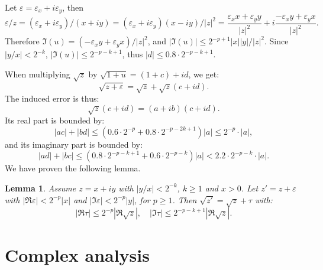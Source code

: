 \documentclass [11pt]{article}
\renewcommand {\epsilon}{\varepsilon}
\newtheorem{lemma}[theorem]{Lemma}
\begin{document}
Let $\epsilon = \epsilon_x + i \epsilon_y$, then
\[ \epsilon/z = (\epsilon_x + i \epsilon_y)/(x + iy) =
  (\epsilon_x + i \epsilon_y)(x-iy)/|z|^2
  = \frac{\epsilon_x x + \epsilon_y y}{|z|^2}
  + i \frac{-\epsilon_x y + \epsilon_y x}{|z|^2}. \]
Therefore $\Im(u) = (-\epsilon_x y + \epsilon_y x)/|z|^2$,
and $|\Im(u)| \le 2^{-p+1} |x| |y|/|z|^2$.
Since $|y/x| < 2^{-k}$, $|\Im(u)| \le 2^{-p-k+1}$,
thus $|d| \le 0.8 \cdot 2^{-p-k+1}$.

When multiplying $\sqrt{z}$ by $\sqrt{1+u} = (1+c)+id$, we get:
\[ \sqrt{z + \epsilon} = \sqrt{z} + \sqrt{z}  (c + i d). \]
The induced error is thus:
\[ \sqrt{z}  (c + i d) = (a + ib) (c + i d). \]
Its real part is bounded by:
\[ |ac| + |bd| \le (0.6 \cdot 2^{-p} + 0.8 \cdot 2^{-p-2k+1}) |a|
  \le 2^{-p} \cdot |a|, \]
and its imaginary part is bounded by:
\[ |ad| + |bc| \le (0.8 \cdot 2^{-p-k+1} + 0.6 \cdot 2^{-p-k}) |a|
  < 2.2 \cdot 2^{-p-k} \cdot |a|. \]
We have proven the following lemma.
\begin{lemma} \label{lem:sqrt}
  Assume $z = x + iy$ with $|y/x| < 2^{-k}$, $k \ge 1$ and $x > 0$.
  Let $z' = z + \epsilon$ with $|\Re\epsilon| < 2^{-p} |x|$
  and $|\Im\epsilon| < 2^{-p} |y|$, for $p \ge 1$.
  Then $\sqrt{z'} = \sqrt{z} + \tau$ with:
  \[ |\Re\tau| \le 2^{-p} |\Re\sqrt{z}|, \quad
     |\Im\tau| \le 2^{-p-k+1} |\Re\sqrt{z}|. \]
\end{lemma}

\section {Complex analysis}
\end{document}

